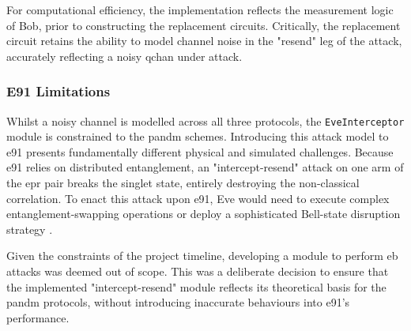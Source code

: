 \begin{algorithm}[H]
    \caption{Intercept-Resend Eavesdropper Logic.}\label{alg:eve_intercept}
\end{algorithm}

For computational efficiency, the implementation reflects the measurement logic of Bob, prior to constructing the replacement circuits. Critically, the replacement circuit retains the ability to model channel noise in the "resend" leg of the attack, accurately reflecting a noisy \gls{qchan} under attack.

\subsubsection{E91 Limitations}
Whilst a noisy channel is modelled across all three protocols, the \texttt{EveInterceptor} module is constrained to the \gls{pandm} schemes. Introducing this attack model to \gls{e91} presents fundamentally different physical and simulated challenges. Because \gls{e91} relies on distributed \gls{entanglement}, an "intercept-resend" attack on one arm of the \gls{epr} pair breaks the singlet state, entirely destroying the non-classical correlation. To enact this attack upon \gls{e91}, Eve would need to execute complex \gls{entanglement}-swapping operations or deploy a sophisticated Bell-state disruption strategy \cite{E91}. 

Given the constraints of the project timeline, developing a module to perform \gls{eb} attacks was deemed out of scope. This was a deliberate decision to ensure that the implemented "intercept-resend" module reflects its theoretical basis for the \gls{pandm} protocols, without introducing inaccurate behaviours into \gls{e91}'s performance.



